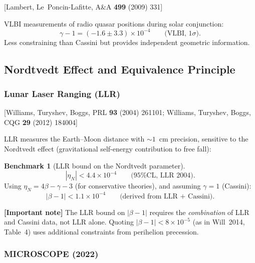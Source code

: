 \documentclass[11pt,a4paper]{article}
\theoremstyle{plain}
\theoremstyle{definition}
\newtheorem{benchmark}[theorem]{Benchmark}
\theoremstyle{remark}
\newcommand{\fromlit}[1]{\textcolor{sctblue}{\textsf{[#1]}}}
\newcommand{\signcorrection}[1]{%
  \par\smallskip\noindent
  \colorbox{red!10}{\parbox{\dimexpr\linewidth-2\fboxsep}{%
    \textcolor{red!60!black}{\textbf{[Important note]}} #1}}%
  \par\smallskip}
\begin{document}
\fromlit{Lambert, Le~Poncin-Lafitte, A\&A \textbf{499} (2009) 331}

VLBI measurements of radio quasar positions during solar conjunction:
\begin{equation}\label{eq:vlbi}
  \gamma - 1 = (-1.6 \pm 3.3) \times 10^{-4}
  \qquad\text{(VLBI, 1$\sigma$)}.
\end{equation}
Less constraining than Cassini but provides independent
geometric information.

\subsection{Nordtvedt Effect and Equivalence Principle}

\subsubsection{Lunar Laser Ranging (LLR)}

\fromlit{Williams, Turyshev, Boggs, PRL \textbf{93} (2004) 261101;
Williams, Turyshev, Boggs, CQG \textbf{29} (2012) 184004}

LLR measures the Earth--Moon distance with $\sim 1$~cm precision,
sensitive to the Nordtvedt effect (gravitational self-energy
contribution to free fall):

\begin{benchmark}[LLR bound on the Nordtvedt parameter]
\label{bench:llr}
\begin{equation}\label{eq:llr-eta}
  |\eta_N| < 4.4 \times 10^{-4}
  \qquad\text{(95\% CL, LLR 2004)}.
\end{equation}
Using $\eta_N = 4\beta - \gamma - 3$ (for conservative theories), and
assuming $\gamma = 1$ (Cassini):
\begin{equation}\label{eq:llr-beta}
  |\beta - 1| < 1.1 \times 10^{-4}
  \qquad\text{(derived from LLR + Cassini)}.
\end{equation}
\end{benchmark}

\signcorrection{The LLR bound on $|\beta - 1|$ requires the
\emph{combination} of LLR and Cassini data, not LLR alone.
Quoting $|\beta - 1| < 8 \times 10^{-5}$ (as in Will~2014, Table~4)
uses additional constraints from perihelion precession.}

\subsubsection{MICROSCOPE (2022)}
\end{document}
